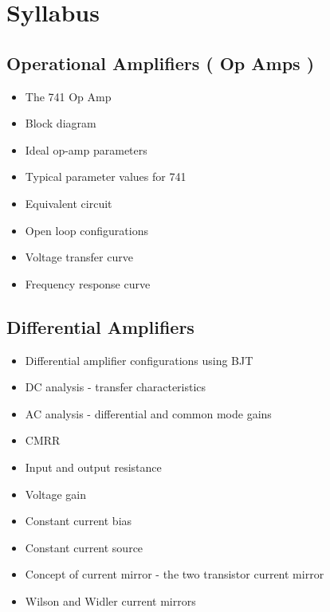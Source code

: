 \documentclass[../course]{subfiles}
\begin{document}
\section{Syllabus}

\subsection{Operational Amplifiers ( Op Amps )}

\begin{itemize}
    \item The 741 Op Amp
    \item Block diagram
    \item Ideal op-amp parameters
    \item Typical parameter values for 741
    \item Equivalent circuit
    \item Open loop configurations
    \item Voltage transfer curve
    \item Frequency response curve
\end{itemize}

\subsection{Differential Amplifiers}

\begin{itemize}
    \item Differential amplifier configurations using BJT
    \item DC analysis - transfer characteristics
    \item AC analysis - differential and common mode gains
    \item CMRR
    \item Input and output resistance
    \item Voltage gain
    \item Constant current bias
    \item Constant current source
    \item Concept of current mirror - the two transistor current mirror
    \item Wilson and Widler current mirrors
\end{itemize}
\end{document}
